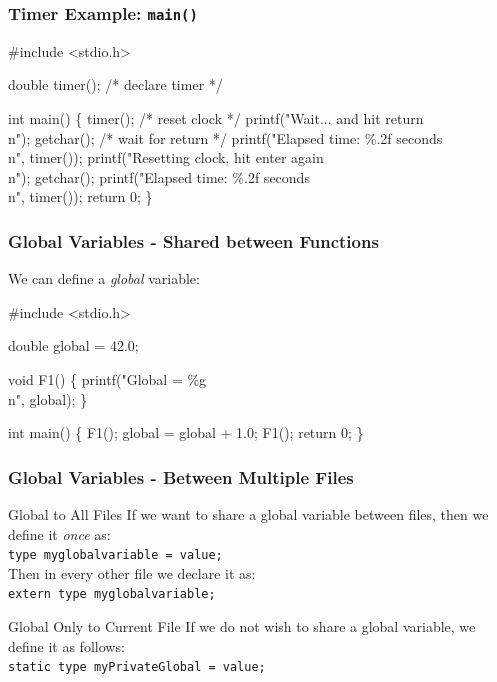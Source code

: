 \documentclass[table]{beamer}
\newif\ifschigh\schighfalse
\newcommand{\kw}[1]{\ifschigh\textcolor{red}{#1}\else\textcolor{keyword}{#1}\fi}
\newcommand{\kt}[1]{\ifschigh\textcolor{red}{#1}\else\textcolor{ctext}{#1}\fi}
\newcommand{\kc}[1]{\ifschigh\textcolor{red}{#1}\else\textcolor{comment}{#1}\fi}
\newcounter{sckll}
\newcommand{\kr}{\setcounter{sckll}{1}}
\newcommand{\kl}{}
\begin{document}
\begin{frame}[fragile]
\frametitle{Timer Example: {\tt main()}}
\begin{semiverbatim}
\small
\kr\kl\kw{\#include} \kt{<stdio.h>}
\kl
\kl\kw{double} timer(); \kc{/* declare timer */}
\kl
\kl\kw{int} main()
\kl\{
\kl   timer(); \kc{/* reset clock */}
\kl   printf(\kt{"Wait... and hit return\\n"});
\kl   getchar(); \kc{/* wait for return */}
\kl   printf(\kt{"Elapsed time: \%.2f seconds\\n"}, timer());
\kl   printf(\kt{"Resetting clock, hit enter again\\n"});
\kl   getchar();
\kl   printf(\kt{"Elapsed time: \%.2f seconds\\n"}, timer());
\kl   \kw{return} 0;
\kl\}
\end{semiverbatim}
\end{frame}

\begin{frame}[fragile]
\frametitle{Global Variables - Shared between Functions}
We can define a \emph{global} variable:
\begin{semiverbatim}
\small
\kr\kl\kw{\#include} \kt{<stdio.h>}
\kl
\kl\kw{double} global = 42.0;
\kl
\kl\kw{void} F1()
\kl\{
\kl   printf(\kt{"Global = \%g\\n"}, global);
\kl\}
\kl
\kl\kw{int} main()
\kl\{
\kl   F1();
\kl   global = global + 1.0;
\kl   F1();
\kl   \kw{return} 0;
\kl\}
\end{semiverbatim}
\end{frame}

\begin{frame}
\frametitle{Global Variables - Between Multiple Files}
\begin{exampleblock}{Global to All Files}
If we want to share a global variable between files,
then we define it \emph{once} as:\\
{\tt type myglobalvariable = value;}\\
Then in every other file we declare it as:\\
{\tt \kw{extern} type myglobalvariable;}
\end{exampleblock}

\begin{alertblock}{Global Only to Current File}
If we do not wish to share a global variable, we
define it as follows:\\
{\tt \kw{static} type myPrivateGlobal = value;}
\end{alertblock}
\end{frame}
\end{document}
